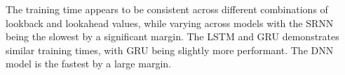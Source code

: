 




\newpage
The training time appears to be consistent across different combinations of lookback and lookahead values, while varying across models with the SRNN being the slowest by a significant margin. The LSTM and GRU demonstrates similar training times, with GRU being slightly more performant. The DNN model is the fastest by a large margin.

